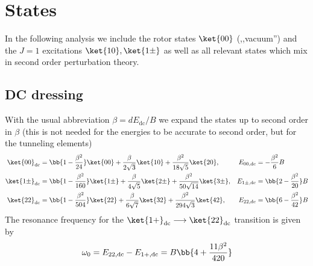 \section{States}
In the following analysis we include the rotor states $\ket{00}$ (,,vacuum'') and the $J=1$ excitations $\ket{10}, \ket{1\pm}$ as well as all relevant states which mix in second order perturbation theory.

\subsection{DC dressing}
With the usual abbreviation $\beta=d E_\text{dc}/B$ we expand the states up to second order in $\beta$ (this is not needed for the energies to be accurate to second order, but for the tunneling elements)
\begin{align*}
\ket{00}_\text{dc}&=\bb{1-\frac{\beta^2}{24}} \ket{00} + \frac{\beta}{2\sqrt{3}} \ket{10} + \frac{\beta^2}{18\sqrt{5}} \ket{20}, & E_{00,\text{dc}}&=-\frac{\beta^2}{6} B\\
%
%
\ket{1\pm}_\text{dc}&=\bb{1-\frac{\beta^2}{160}} \ket{1\pm} + \frac{\beta}{4\sqrt{5}} \ket{2\pm} + \frac{\beta^2}{50\sqrt{14}} \ket{3\pm}, & E_{1\pm,\text{dc}}&=\bb{2-\frac{\beta^2}{20}} B \\
%
\ket{22}_\text{dc}&=\bb{1-\frac{\beta^2}{504}} \ket{22} + \frac{\beta}{6\sqrt{7}} \ket{32} + \frac{\beta^2}{294\sqrt{3}} \ket{42}, & E_{22,\text{dc}}&=\bb{6-\frac{\beta^2}{42}} B
\end{align*}
The resonance frequency
for the $\ket{1+}_\text{dc}\longrightarrow\ket{22}_\text{dc}$
transition is given by
\begin{align}
\omega_0 = E_{22,\text{dc}}-E_{1+,\text{dc}}=B\bb{4+\frac{11\beta^2}{420}}
\end{align}

